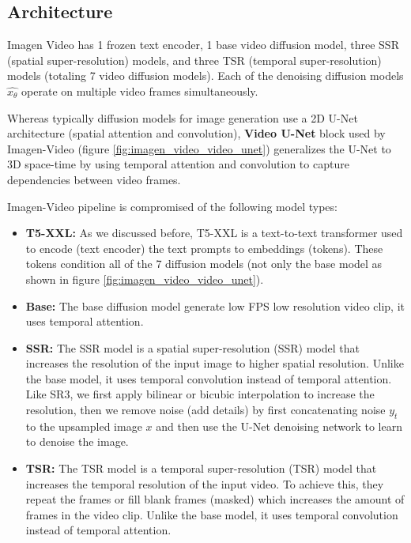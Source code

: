 \subsection{Architecture}

Imagen Video has 1 frozen text encoder, 1 base video diffusion model, three SSR (spatial super-resolution) models, and three TSR (temporal super-resolution) models (totaling 7 video diffusion models). Each of the denoising diffusion models $\hat{x_\theta}$ operate on multiple video frames simultaneously.

Whereas typically diffusion models for image generation use a 2D U-Net architecture (spatial attention and convolution), \textbf{Video U-Net} block used by Imagen-Video (figure \ref{fig:imagen_video_video_unet}) generalizes the U-Net to 3D space-time by using temporal attention and convolution to capture dependencies between video frames.

Imagen-Video pipeline is compromised of the following model types:

\begin{itemize}
    \item \textbf{T5-XXL:} As we discussed before, T5-XXL is a text-to-text transformer used to encode (text encoder) the text prompts to embeddings (tokens). These tokens condition all of the 7 diffusion models (not only the base model as shown in figure \ref{fig:imagen_video_video_unet}).
    \item \textbf{Base:} The base diffusion model generate low FPS low resolution video clip, it uses temporal attention.
    \item \textbf{SSR:} The SSR model is a spatial super-resolution (SSR) model that increases the resolution of the input image to higher spatial resolution. Unlike the base model, it uses temporal convolution instead of temporal attention. Like SR3, we first apply bilinear or bicubic interpolation to increase the resolution, then we remove noise (add details) by first concatenating noise $y_t$ to the upsampled image $x$ and then use the U-Net denoising network to learn to denoise the image.
    \item \textbf{TSR:} The TSR model is a temporal super-resolution (TSR) model that increases the temporal resolution of the input video. To achieve this, they repeat the frames or fill blank frames (masked) which increases the amount of frames in the video clip. Unlike the base model, it uses temporal convolution instead of temporal attention.
\end{itemize}



